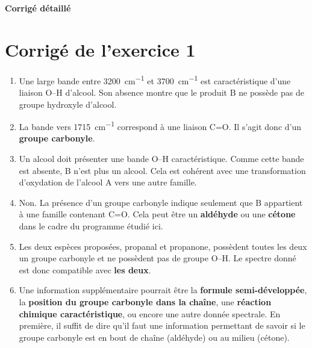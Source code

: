 \documentclass[11pt,a4paper]{article}
\begin{document}
\newpage
\begin{center}
{\LARGE \textbf{Corrigé détaillé}}
\end{center}

\section*{Corrigé de l'exercice 1}
\begin{enumerate}[label=\textbf{\arabic*.},leftmargin=1.2em]
    \item Une large bande entre \SI{3200}{cm^{-1}} et \SI{3700}{cm^{-1}} est caractéristique d'une liaison O--H d'alcool. Son absence montre que le produit B ne possède pas de groupe hydroxyle d'alcool.

    \item La bande vers \SI{1715}{cm^{-1}} correspond à une liaison C=O. Il s'agit donc d'un \textbf{groupe carbonyle}.

    \item Un alcool doit présenter une bande O--H caractéristique. Comme cette bande est absente, B n'est plus un alcool. Cela est cohérent avec une transformation d'oxydation de l'alcool A vers une autre famille.

    \item Non. La présence d'un groupe carbonyle indique seulement que B appartient à une famille contenant C=O. Cela peut être un \textbf{aldéhyde} ou une \textbf{cétone} dans le cadre du programme étudié ici.

    \item Les deux espèces proposées, propanal et propanone, possèdent toutes les deux un groupe carbonyle et ne possèdent pas de groupe O--H. Le spectre donné est donc compatible avec \textbf{les deux}.

    \item Une information supplémentaire pourrait être la \textbf{formule semi-développée}, la \textbf{position du groupe carbonyle dans la chaîne}, une \textbf{réaction chimique caractéristique}, ou encore une autre donnée spectrale. En première, il suffit de dire qu'il faut une information permettant de savoir si le groupe carbonyle est en bout de chaîne (aldéhyde) ou au milieu (cétone).
\end{enumerate}
\end{document}

